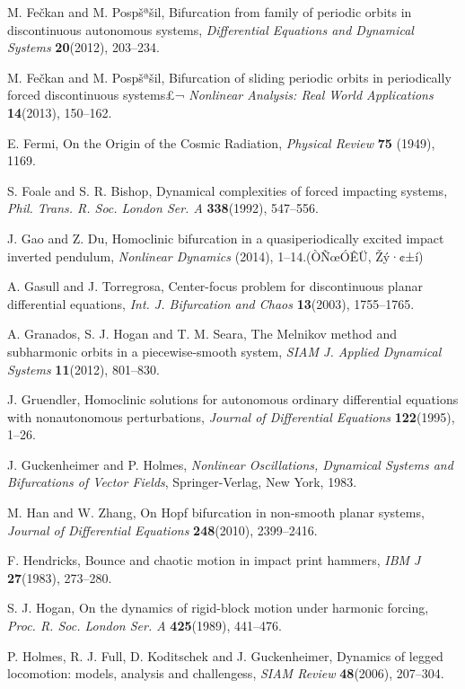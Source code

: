 \documentclass[12pt,openany,CJK,oneside]{cctbook}
\begin{document}
{{\begin{thebibliography}{999}
 M. Fe\v{c}kan and M. Pospšª\v{s}il, Bifurcation from family of periodic orbits in discontinuous autonomous systems, {\it Differential Equations and Dynamical Systems} {\bf 20}(2012), 203--234.

 M. Fe\v{c}kan and M. Pospšª\v{s}il, Bifurcation of sliding periodic orbits in periodically forced discontinuous systems£¬ {\it Nonlinear Analysis: Real World Applications} {\bf 14}(2013), 150--162.

 E. Fermi, On the Origin of the Cosmic Radiation, {\it Physical Review} {\bf 75} (1949), 1169.

 S. Foale and S. R. Bishop, Dynamical complexities of forced impacting systems,
{\it Phil. Trans. R. Soc. London Ser. A} {\bf 338}(1992), 547--556.

 J. Gao and Z. Du, Homoclinic bifurcation in a quasiperiodically excited impact inverted pendulum,
{\it Nonlinear Dynamics} (2014), 1--14.(ÒÑœÓÊÜ, Žý·¢±í)

A. Gasull and J. Torregrosa, Center-focus problem for discontinuous planar differential equations, {\it Int. J. Bifurcation and Chaos} {\bf 13}(2003), 1755--1765.

A. Granados, S. J. Hogan and T. M. Seara,
The Melnikov method and subharmonic orbits in a piecewise-smooth system,
{\it SIAM J. Applied Dynamical Systems} {\bf 11}(2012), 801--830.

 J. Gruendler,
Homoclinic solutions for autonomous ordinary differential equations with nonautonomous perturbations,
{\it Journal of Differential Equations} {\bf 122}(1995), 1--26.

J. Guckenheimer and P. Holmes, {\it Nonlinear Oscillations, Dynamical Systems and
Bifurcations of Vector Fields}, Springer-Verlag, New York, 1983.

M. Han and W. Zhang, On Hopf bifurcation in non-smooth planar systems, {\it  Journal of Differential Equations} {\bf 248}(2010), 2399--2416.

F. Hendricks, Bounce and chaotic motion in impact print hammers, {\it IBM J} {\bf 27}(1983), 273--280.

S. J. Hogan, On the dynamics of rigid-block motion under harmonic forcing, {\it Proc. R. Soc. London Ser. A} {\bf 425}(1989), 441--476.

P. Holmes, R. J. Full, D. Koditschek and J. Guckenheimer, Dynamics of legged locomotion: models, analysis and challengess, {\it SIAM Review} {\bf 48}(2006), 207--304.


\end{thebibliography}}}
\end{document}
